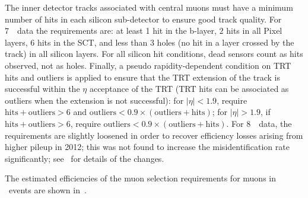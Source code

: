 The inner detector tracks associated with central muons must have a minimum
number of hits in each silicon sub-detector to ensure good track quality. For
7~\tev\ data the requirements are: at least 1 hit in the b-layer, $2$ hits in all Pixel
layers, $6$ hits in the SCT, and less than 3 holes (no hit in a layer crossed by the
track) in all silicon layers. For all silicon hit conditions, dead sensors count
as hits observed, not as holes.  Finally, a pseudo rapidity-dependent condition
on TRT hits and outliers is applied to ensure that the TRT extension of the
track is successful within the $\eta$ acceptance of the TRT (TRT hits can be
associated as outliers when the extension is not successful): for $|\eta| <
1.9$, require $\mathrm{hits}+\mathrm{outliers} > 6$ and $\mathrm{outliers} < 0.9
\times (\mathrm{outliers}+\mathrm{hits})$; for $|\eta| > 1.9$, if
$\mathrm{hits}+\mathrm{outliers} > 6$, require $\mathrm{outliers} < 0.9 \times
(\mathrm{outliers}+\mathrm{hits})$. For 8~\tev\ data, the
requirements are slightly loosened in order to recover efficiency losses arising
from higher pileup in 2012; this was not found to increase the misidentification rate significantly;
see~ for details of the changes.

The estimated efficiencies of the muon selection requirements for muons in
\ZZ\ events are shown in~.

